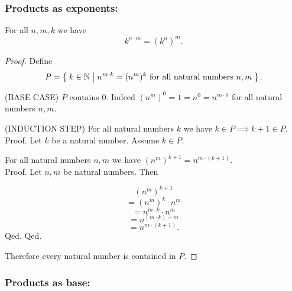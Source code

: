 \documentclass[../../arithmetic.ftl.tex]{subfiles}
\begin{document}
  \subsubsection*{Products as exponents:}

  \begin{forthel}
    \begin{proposition}\label{Arithmetic_01_04_531499}
      For all $n,m,k$ we have \[ k^{n \cdot m} = (k^{n})^{m}. \]
    \end{proposition}
    \begin{proof}
      Define \[ P = \Set{k \in \mathbb{N} | \text{$n^{m \cdot k} = (n^{m})^{k}$ for all natural numbers $n,m$}}. \]

      (BASE CASE) $P$ contains $0$.
      Indeed $(n^{m})^{0} = 1 = n^{0} = n^{m \cdot 0}$ for all natural numbers $n,m$.

      (INDUCTION STEP) For all natural numbers $k$ we have $k \in P \implies k + 1 \in P$. \\
      Proof.
        Let $k$ be a natural number.
        Assume $k \in P$.

        For all natural numbers $n,m$ we have $(n^{m})^{k + 1} =
        n^{m \cdot (k + 1)}$. \\
        Proof.
          Let $n,m$ be natural numbers.
          Then

          \[   (n^{m})^{k + 1} \]
          \[ = (n^{m})^{k} \cdot n^{m} \]   %
          \[ = n^{m \cdot k} \cdot n^{m} \] %
          \[ = n^{(m \cdot k) + m} \]       %
          \[ = n^{m \cdot (k + 1)}. \]      %
        Qed.
      Qed.

      Therefore every natural number is contained in $P$.
    \end{proof}
  \end{forthel}


  \subsubsection*{Products as base:}
\end{document}
